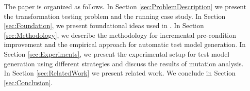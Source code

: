 The paper is organized as follows. In Section \ref{sec:ProblemDescription} we present the transformation testing problem and the running case study. In Section \ref{sec:Foundation}, we present foundational ideas used in {\Pramana}. In  Section \ref{sec:Methodology}, we describe the {\Pramana} methodology for incremental pre-condition improvement and the empirical approach for automatic test model generation. In Section \ref{sec:Experiments}, we present the experimental setup for test model generation using different strategies and discuss the results of mutation analysis. In Section \ref{sec:RelatedWork} we present related work. We conclude in Section \ref{sec:Conclusion}.
